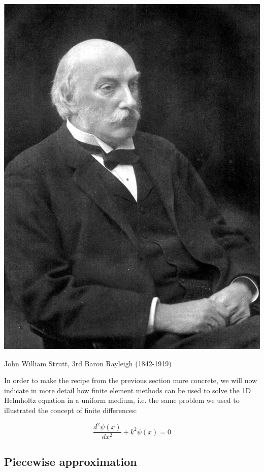 \begin{marginfigure}[0.5cm]
  \includegraphics{numeric/figures/Rayleigh}
  \caption{John William Strutt, 3rd Baron Rayleigh (1842-1919)}
\end{marginfigure}

In order to make the recipe from the previous section more concrete, we will now indicate in more detail how finite element methods can be used to solve the 1D Helmholtz equation in a uniform medium, i.e. the same problem we used to illustrated the concept of finite differences:

\begin{equation}
\frac{d^2 \psi (x)}{d x^2} + k^2 \psi(x) = 0 \label{eq-helmholtz-1d-2}
\end{equation} 

\subsection{Piecewise approximation}

